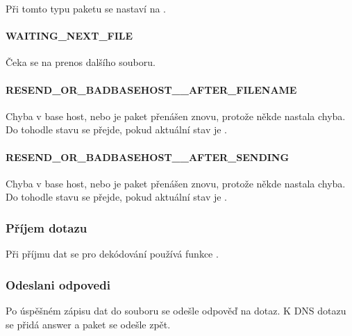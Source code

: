 Při tomto typu paketu se nastaví  na .

\paragraph{WAITING\_NEXT\_FILE}
Čeka se na prenos dalšího souboru.

\paragraph{RESEND\_OR\_BADBASEHOST\_\_AFTER\_FILENAME}
Chyba v base host, nebo je paket přenášen znovu, protože někde nastala chyba.
Do tohodle stavu se přejde, pokud aktuální stav je .

\paragraph{RESEND\_OR\_BADBASEHOST\_\_AFTER\_SENDING}
Chyba v base host, nebo je paket přenášen znovu, protože někde nastala chyba.
Do tohodle stavu se přejde, pokud aktuální stav je .

\subsubsection{Příjem dotazu} \label{sec:odeslani-dotazu-s}
Při příjmu dat se pro dekódování používá funkce
\cite{encodingData}.

\subsubsection{Odeslani odpovedi}\label{sec:prijimani-odpovedi-s}
Po úspěšném zápisu dat do souboru se odešle odpověď na dotaz.
K DNS dotazu se přidá answer a paket se odešle zpět.
